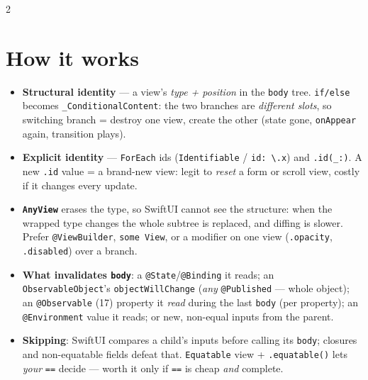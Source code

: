 \documentclass[8pt]{extarticle}
\begin{document}


\begin{multicols}{2}
\raggedright

\section{How it works}
\begin{itemize}
  \item \textbf{Structural identity} — a view's \emph{type + position} in the \texttt{body} tree.
        \texttt{if/else} becomes \texttt{\_ConditionalContent}: the two branches are \emph{different slots},
        so switching branch = destroy one view, create the other (state gone, \texttt{onAppear} again,
        transition plays).
  \item \textbf{Explicit identity} — \texttt{ForEach} ids (\texttt{Identifiable} / \texttt{id: \textbackslash.x})
        and \texttt{.id(\_:)}. A new \texttt{.id} value = a brand-new view: legit to \emph{reset} a form or
        scroll view, costly if it changes every update.
  \item \textbf{\texttt{AnyView}} erases the type, so SwiftUI cannot see the structure: when the wrapped
        type changes the whole subtree is replaced, and diffing is slower. Prefer \texttt{@ViewBuilder},
        \texttt{some View}, or a modifier on one view (\texttt{.opacity}, \texttt{.disabled}) over a branch.
  \item \textbf{What invalidates \texttt{body}}: a \texttt{@State}/\texttt{@Binding} it reads; an
        \texttt{ObservableObject}'s \texttt{objectWillChange} (\emph{any} \texttt{@Published} — whole object);
        an \texttt{@Observable} (17) property it \emph{read} during the last \texttt{body} (per property);
        an \texttt{@Environment} value it reads; or new, non-equal inputs from the parent.
  \item \textbf{Skipping}: SwiftUI compares a child's inputs before calling its \texttt{body}; closures and
        non-equatable fields defeat that. \texttt{Equatable} view + \texttt{.equatable()} lets \emph{your}
        \texttt{==} decide — worth it only if \texttt{==} is cheap \emph{and} complete.

\end{itemize}
\end{multicols}
\end{document}
